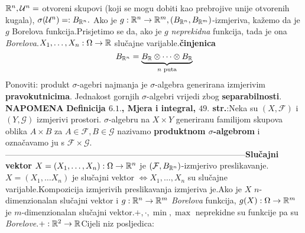 \documentclass{article}
\begin{document}
\(\Bbb R^n,\mathcal U^n=\) otvoreni skupovi (koji se mogu dobiti kao prebrojive unije otvorenih kugala), \(\sigma(\mathcal U^n)=:B_{\Bbb R^n}.\)\newline
Ako je \(g:\Bbb R^n\to\Bbb R^m,\left(B_{\Bbb R^n},B_{\Bbb R^m}\right)\)-izmjeriva, kažemo da je \(g\) Borelova funkcija.\newline Prisjetimo se da, ako je \(g\) \textit{neprekidna} funkcija, tada je ona \textit{Borelova}.\newline \(X_1,\ldots, X_n:\Omega\to\Bbb R\) slučajne varijable.\newline \textbf{činjenica} \[B_{\Bbb R^n}=\underbrace{B_{\Bbb R}\otimes\cdots\otimes B_{\Bbb R}}_{n\text{ puta}}\] Ponoviti: produkt \(\sigma\)-agebri najmanja je \(\sigma\)-algebra generirana izmjerivim \textbf{pravokutnicima}. Jednakost gornjih \(\sigma\)-algebri vrijedi zbog \textbf{separabilnosti}.\newline\newline
{}\textbf{NAPOMENA} \textbf{Definicija \(6.1.\), Mjera i integral, \(49.\) str.}:\newline Neka su \((X,\mathcal F)\) i \((Y,\mathcal G)\) izmjerivi prostori. \(\sigma\)-algebru na \(X\times Y\)  generiranu familijom skupova oblika \(A\times B\) za \(A\in\mathcal F,B\in\mathcal G\) nazivamo \textbf{produktnom \(\sigma\)-algebrom} i označavamo ju s \(\mathcal F\times\mathcal G.\)\newline\newline---------------------------------------------------------------------------------------\newline\newline \textbf{Slučajni vektor} \(X=(X_1,\ldots, X_n):\Omega\to\Bbb R^n\) je \((\mathcal F,B_{\Bbb R^n})\)-izmjerivo preslikavanje.\newline \(X=(X_1,\ldots X_n)\) je slučajni vektor \(\Leftrightarrow X_1,\ldots, X_n\) su slučajne varijable.\newline Kompozicija izmjerivih preslikavanja izmjeriva je.\newline Ako je \(X\) \(\boxed{n}\)-dimenzionalan slučajni vektor i \(g:\Bbb R^n\to\Bbb R^m\) \textit{Borelova} funkcija, \(g(X):\Omega\to\Bbb R^m\) je \(\boxed{m}\)-dimenzionalan slučajni vektor.\newline \(+,\cdot,\min,\max\) neprekidne su funkcije pa su \textit{Borelove}.\newline \(+:\Bbb R^2\to\Bbb R\)\newline Cijeli niz posljedica:\newline
\end{document}
